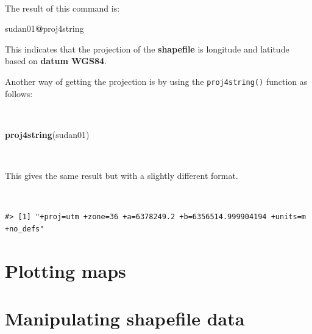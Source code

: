 \documentclass[12pt,a4paper,a4paper]{book}
\newenvironment{Shaded}{\begin{snugshade}}{\end{snugshade}}
\newcommand{\KeywordTok}[1]{\textcolor[rgb]{0.13,0.29,0.53}{\textbf{#1}}}
\newcommand{\OperatorTok}[1]{\textcolor[rgb]{0.81,0.36,0.00}{\textbf{#1}}}
\newcommand{\NormalTok}[1]{#1}
\theoremstyle{definition}
\theoremstyle{definition}
\theoremstyle{definition}
\theoremstyle{remark}
\begin{document}
~

The result of this command is:

\begin{Shaded}
\begin{Highlighting}[]
\NormalTok{sudan01}\OperatorTok{@}\NormalTok{proj4string}
\end{Highlighting}
\end{Shaded}

This indicates that the projection of the \textbf{shapefile} is
longitude and latitude based on \textbf{datum WGS84}.

Another way of getting the projection is by using the
\texttt{proj4string()} function as follows:

~

\begin{Shaded}
\begin{Highlighting}[]
\KeywordTok{proj4string}\NormalTok{(sudan01)}
\end{Highlighting}
\end{Shaded}

~

This gives the same result but with a slightly different format.

~

\begin{verbatim}
#> [1] "+proj=utm +zone=36 +a=6378249.2 +b=6356514.999904194 +units=m +no_defs"
\end{verbatim}

\hypertarget{exercise2}{%
\chapter{Plotting maps}\label{exercise2}}

\hypertarget{exercise3}{%
\chapter{Manipulating shapefile data}\label{exercise3}}


\end{document}
